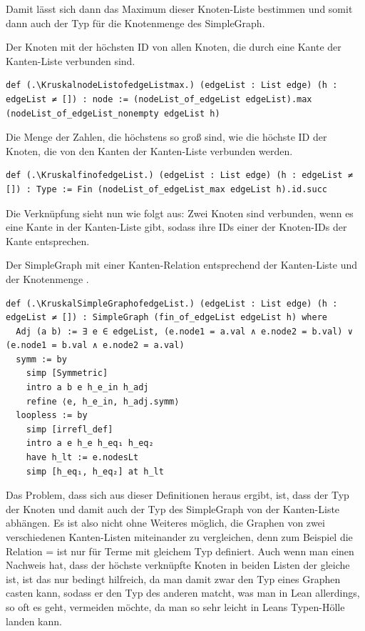Damit lässt sich dann das Maximum dieser Knoten-Liste bestimmen und somit dann auch der Typ für die Knotenmenge des SimpleGraph.

\begin{definition}[\KruskalnodeListofedgeListmax]\label{KruskalnodeListofedgeListmax}
  Der Knoten mit der höchsten ID von allen Knoten, die durch eine Kante der Kanten-Liste verbunden sind.
\end{definition}
\begin{lstlisting}
def (.\KruskalnodeListofedgeListmax.) (edgeList : List edge) (h : edgeList ≠ []) : node := (nodeList_of_edgeList edgeList).max (nodeList_of_edgeList_nonempty edgeList h)
\end{lstlisting}



\begin{definition}[\KruskalfinofedgeList]
  Die Menge der Zahlen, die höchstens so groß sind, wie die höchste ID der Knoten, die von den Kanten der Kanten-Liste verbunden werden.
\end{definition}
\begin{lstlisting}
def (.\KruskalfinofedgeList.) (edgeList : List edge) (h : edgeList ≠ []) : Type := Fin (nodeList_of_edgeList_max edgeList h).id.succ
\end{lstlisting}

Die Verknüpfung sieht nun wie folgt aus:
Zwei Knoten sind verbunden, wenn es eine Kante in der Kanten-Liste gibt, sodass ihre IDs einer der Knoten-IDs der Kante entsprechen.

\begin{definition}[\KruskalSimpleGraphofedgeList]
  Der SimpleGraph mit einer Kanten-Relation entsprechend der Kanten-Liste und der Knotenmenge \KruskalfinofedgeList.
\end{definition}
\begin{lstlisting}
def (.\KruskalSimpleGraphofedgeList.) (edgeList : List edge) (h : edgeList ≠ []) : SimpleGraph (fin_of_edgeList edgeList h) where
  Adj (a b) := ∃ e ∈ edgeList, (e.node1 = a.val ∧ e.node2 = b.val) ∨ (e.node1 = b.val ∧ e.node2 = a.val)
  symm := by
    simp [Symmetric]
    intro a b e h_e_in h_adj
    refine ⟨e, h_e_in, h_adj.symm⟩
  loopless := by
    simp [irrefl_def]
    intro a e h_e h_eq₁ h_eq₂
    have h_lt := e.nodesLt
    simp [h_eq₁, h_eq₂] at h_lt
\end{lstlisting}

Das Problem, dass sich aus dieser Definitionen heraus ergibt, ist, dass der Typ der Knoten und damit auch der Typ des SimpleGraph von der Kanten-Liste abhängen.
Es ist also nicht ohne Weiteres möglich, die Graphen von zwei verschiedenen Kanten-Listen miteinander zu vergleichen, denn zum Beispiel die Relation = ist nur für Terme mit gleichem Typ definiert.
Auch wenn man einen Nachweis hat, dass der höchste verknüpfte Knoten in beiden Listen der gleiche ist, ist das nur bedingt hilfreich,
da man damit zwar den Typ eines Graphen casten kann, sodass er den Typ des anderen matcht, was man in Lean allerdings, so oft es geht, vermeiden möchte,
da man so sehr leicht in Leans \glqq Typen-Hölle \grqq landen kann.

